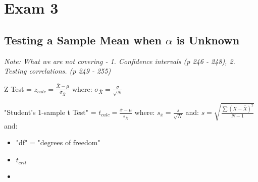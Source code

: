 \documentclass[11pt]{report}
\begin{document}
\chapter{Exam 3}

\section{Testing a Sample Mean when $\alpha$ is Unknown}
\textit{Note: What we are not covering - 1. Confidence intervals (p 246 - 248), 2. Testing correlations. (p 249 - 255)}

{ %
    Z-Test = $z_{calc} = \frac{\bar{X} - \mu}{\sigma_{\bar{X}}}$ \newline
    where: \newline
    $\sigma_{\bar{X}} = \frac{\sigma}{\sqrt{N}}$ \newline

    "Student's 1-sample t Test" = $t_{calc} = \frac{\bar{x} - \mu}{s_{\bar{X}}}$ \newline
    where: \newline
    $s_{\bar{x}} = \frac{s}{\sqrt{N}}$ \newline
    and: \newline 
    $s = \sqrt{\frac{\sum(X - \bar{X})^2}{N - 1}}$ \newline
    and: \newline
    \begin{itemize}
        \item "df" = "degrees of freedom"
        \item $t_{crit}$
        \item 
    \end{itemize}
}
\end{document}
